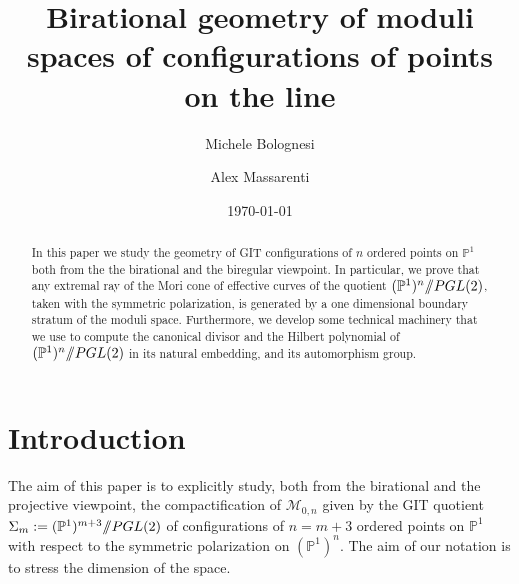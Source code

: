 \documentclass[a4paper,10pt]{amsart}
\theoremstyle{definition}
\renewcommand{\P}{\mathbb{P}}
\newcommand{\quot}{/\hspace{-1.2mm}/}
\begin{document}
\title[\resizebox{5.5in}{!}{Birational geometry of moduli spaces of configurations of points on the line}]{Birational geometry of moduli spaces of configurations of points on the line}

\author[Michele Bolognesi]{Michele Bolognesi}
\address{\sc Michele Bolognesi\\
IMAG - Universit\'e de Montpellier\\
Place Eug\`ene Bataillon\\
34095 Montpellier Cedex 5\\ France}

\author[Alex Massarenti]{Alex Massarenti}
\address{\sc Alex Massarenti\\ Dipartimento di Matematica e Informatica, Universit\`a di Ferrara, Via Machiavelli 30, 44121 Ferrara, Italy}

\date{\today}

\begin{abstract}
In this paper we study the geometry of GIT configurations of $n$ ordered points on $\mathbb{P}^1$ both from the the birational and the biregular viewpoint. In particular, we prove that any extremal ray of the Mori cone of effective curves of the quotient $(\mathbb{P}^1)^n\quot PGL(2)$, taken with the symmetric polarization, is generated by a one dimensional boundary stratum of the moduli space. Furthermore, we develop some technical machinery that we use to compute the canonical divisor and the Hilbert polynomial of $(\mathbb{P}^1)^n\quot PGL(2)$ in its natural embedding, and its automorphism group.
\end{abstract}

\maketitle
\tableofcontents

\section*{Introduction}
The aim of this paper is to explicitly study, both from the birational and the projective viewpoint, the compactification of $\mathcal{M}_{0,n}$ given by the GIT quotient $\Sigma_m : = (\mathbb{P}^1)^{m+3}\quot PGL(2)$ of configurations of $n = m+3$ ordered points on $\P^1$ with respect to the symmetric polarization on $(\mathbb{P}^1)^n$. The aim of our notation is to stress the dimension of the space. 
\end{document}
